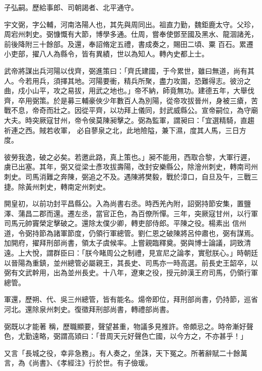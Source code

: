 \begin{pinyinscope}
 子弘嗣。歷給事郎、司朝謁者、北平通守。



 宇文弼，字公輔，河南洛陽人也，其先與周同出。祖直力勤，魏鉅鹿太守。父珍，周宕州刺史。弼慷慨有大節，博學多通。仕周，嘗奉使鄧至國及黑水、龍涸諸羌，前後降附三十餘部。及還，奉詔脩定五禮，書成奏之，賜田二頃、粟
 百石。累遷小吏部，擢八人為縣令，皆有異績，世以為知人。轉內史都上士。



 武帝將謀出兵河陽以伐齊，弼進策曰：「齊氏建國，于今累世，雖曰無道，尚有其人。今若用兵，須擇其地。河陽要衝，精兵所聚，盡力攻圍，恐難得志。彼汾之曲，戍小山平，攻之易拔，用武之地也。」帝不納，師竟無功。建德五年，大舉伐齊，卒用弼策。於是募三輔豪俠少年數百人為別陽，從帝攻拔晉州，身被三瘡，苦戰不息，帝奇而壯之。因從平齊，以功拜上儀同，封武威縣公。宣帝嗣位，為守廟大夫。時突厥寇甘州，帝令侯莫陳昶擊之。弼為監軍，謂昶曰：「宜選精騎，直趨祈連之西。賊若收軍，
 必自蓼泉之北，此地險隘，兼下濕，度其人馬，三日方度。



 彼勞我逸，破之必矣。若邀此路，真上策也。」昶不能用，西取合黎，大軍行遲，虜已出塞。其年，弼又從梁士彥攻拔壽陽，改封安樂縣公，除澮州刺史，轉南司州刺史。司馬消難之奔陳，弼追之不及。遇陳將樊毅，戰於漳口，自旦及午，三戰三捷。除黃州刺史，轉南定州刺史。



 開皇初，以前功封平昌縣公。入為尚書右丞。時西羌內附，詔弼持節安集，置鹽澤、蒲昌二郡而還。遷左丞，當官正色，為百僚所憚。三年，突厥寇甘州，以行軍司馬元帥竇榮定擊破之。還除太僕少卿，轉吏部侍郎。平陳之役。楊素出
 信州道，令弼持節為諸軍節度，仍領行軍總管。劉仁恩之破陳將呂仲肅也，弼有謀焉。加開府，擢拜刑部尚書，領太子虞候率。上嘗親臨釋奠。弼與博士論議，詞致清遠。上大悅，謂群臣曰：「朕今睹周公之制禮，見宣尼之論孝，實慰朕心。」時朝廷以晉陽為重鎮，並州總管必屬親王，其長史、司馬亦一時高選。前長史王韶卒，以弼有文武幹用，出為並州長史。十八年，遼東之役，授元帥漢王府司馬，仍領行軍總管。



 軍還，歷朔、代、吳三州總管，皆有能名。煬帝即位，拜刑部尚書，仍持節，巡省河北。還除泉州刺史。復徵拜刑部尚書，轉禮部尚書。



 弼既以才能著
 稱，歷職顯要，聲望甚重，物議多見推許。帝頗忌之。時帝漸好聲色，尤勤遠略，弼謂高熲曰：「昔周天元好聲色亡國，以今方之，不亦甚乎！」



 又言「長城之役，幸非急務」。有人奏之，坐誅，天下冤之。所著辭賦二十餘萬言，為《尚書》、《孝經注》行於世。有子儉瑗。




\end{pinyinscope}
